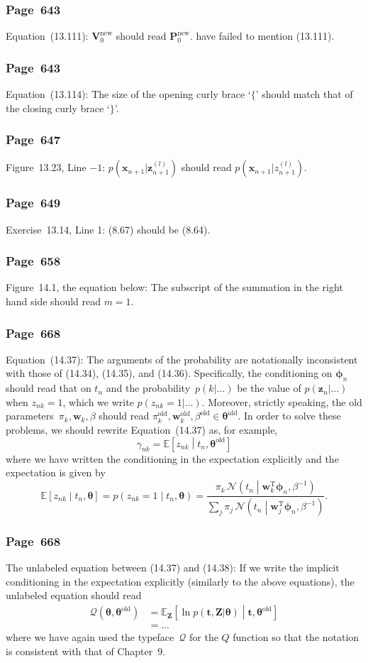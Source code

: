 \documentclass[12pt,a4paper]{article}
\newcommand{\erratum}[1]{\subsubsection*{#1}}
\begin{document}
\erratum{Page~643}
Equation~(13.111):
$\mathbf{V}_{0}^{\text{new}}$ should read $\mathbf{P}_{0}^{\text{new}}$.
\citet{Svensen:PRML_errata} have failed to mention (13.111).

\erratum{Page~643}
Equation~(13.114): The size of the opening curly brace `$\{$' should match
that of the closing curly brace `$\}$'.

\erratum{Page~647}
Figure~13.23, Line $-1$:
$p(\mathbf{x}_{n+1}|\mathbf{z}_{n+1}^{(l)})$ should read $p(\mathbf{x}_{n+1}|{z}_{n+1}^{(l)})$.

\erratum{Page~649}
Exercise~13.14, Line 1: (8.67) should be (8.64).

\erratum{Page~658}
Figure~14.1, the equation below:
The subscript of the summation in the right hand side should read $m = 1$.

\erratum{Page~668}
Equation~(14.37):
The arguments of the probability are notationally inconsistent with those of (14.34), (14.35),
and (14.36).
Specifically, the conditioning on $\bm{\phi}_n$ should read that on $t_n$ and
the probability~$p(k|\dots)$ be the value of $p(\mathbf{z}_{n}|\dots)$ when $z_{nk} = 1$,
which we write $p(z_{nk} = 1|\dots)$.
Moreover, strictly speaking,
the old parameters~$\pi_k, \mathbf{w}_k, \beta$ should read
$\pi_k^{\text{old}}, \mathbf{w}_k^{\text{old}}, \beta^{\text{old}} \in \bm{\theta}^{\text{old}}$.
In order to solve these problems, we should rewrite Equation~(14.37) as, for example,
\begin{equation}
\gamma_{nk} = \mathbb{E}\left[ z_{nk} \middle| t_n, \bm{\theta}^{\text{old}} \right]
\end{equation}
where we have written the conditioning in the expectation explicitly and
the expectation is given by
\begin{equation}
\mathbb{E}\left[ z_{nk} \middle| t_n, \bm{\theta} \right]
  = p\left( z_{nk} = 1 \middle| t_n, \bm{\theta} \right)
  = \frac{\pi_k \,
      \mathcal{N}\left(t_n\middle|\mathbf{w}_k^{\operatorname{T}}\bm{\phi}_n, \beta^{-1}\right)}{
    \sum_j \pi_j \,
      \mathcal{N}\left(t_n\middle|\mathbf{w}_j^{\operatorname{T}}\bm{\phi}_n, \beta^{-1}\right)}.
\end{equation}

\erratum{Page~668}
The unlabeled equation between (14.37) and (14.38):
If we write the implicit conditioning in the expectation explicitly
(similarly to the above equations), the unlabeled equation should read
\begin{align}
\mathcal{Q}\left(\bm{\theta}, \bm{\theta}^{\text{old}}\right)
  &= \mathbb{E}_{\mathbf{Z}}\left[ \ln p(\mathbf{t}, \mathbf{Z}|\bm{\theta}) \middle|
       \mathbf{t}, \bm{\theta}^{\text{old}} \right] \\
  &= ...
\end{align}
where we have again used the typeface~$\mathcal{Q}$ for the $Q$ function so that the notation
is consistent with that of Chapter~9.
\end{document}
